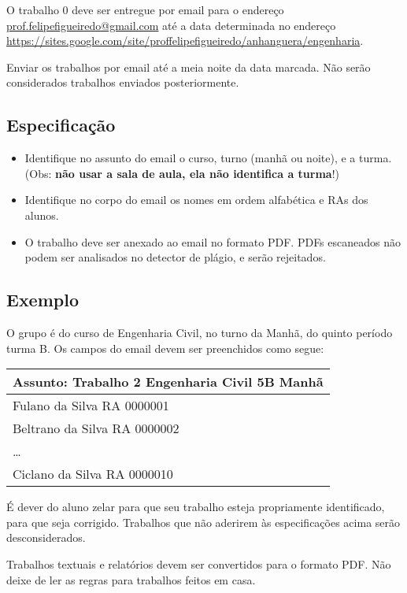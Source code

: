 \documentclass[a4paper]{article}
\begin{document}
O trabalho 0 deve ser entregue por email para o endereço
\url{prof.felipefigueiredo@gmail.com} até a data determinada no
endereço
\url{https://sites.google.com/site/proffelipefigueiredo/anhanguera/engenharia}.
 
Enviar os trabalhos por email até a meia noite da data marcada. Não
serão considerados trabalhos enviados posteriormente.

\subsection{Especificação}

\begin{itemize}
\item Identifique no assunto do email o curso, turno (manhã ou noite),
  e a turma. (Obs: {\bf não usar a sala de aula, ela não identifica a turma}!)
\item Identifique no corpo do email os nomes em ordem alfabética e RAs
  dos alunos.
\item O trabalho deve ser anexado ao email no formato PDF. PDFs
  escaneados não podem ser analisados no detector de plágio, e serão
  rejeitados.
\end{itemize}

\subsection{Exemplo}

O grupo é do curso de Engenharia Civil, no turno da Manhã, do quinto
período turma B. Os campos do email devem ser preenchidos como segue:

\begin{tabular}{|l|}
  \hline
  Assunto: Trabalho 2 Engenharia Civil 5B Manhã\\
  \hline
  Fulano da Silva RA 0000001 \\
  Beltrano da Silva RA 0000002 \\
  \ldots \\
  Ciclano da Silva RA 0000010  \\
  \hline
\end{tabular}
 
É dever do aluno zelar para que seu trabalho esteja propriamente
identificado, para que seja corrigido. Trabalhos que não aderirem às
especificações acima serão desconsiderados.
 
Trabalhos textuais e relatórios devem ser convertidos para o formato
PDF. Não deixe de ler as regras para trabalhos feitos em casa.
\end{document}

